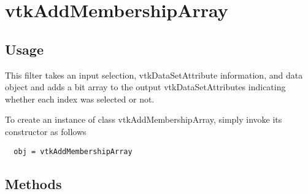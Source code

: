 \section{vtkAddMembershipArray}

\subsection{Usage}

 This filter takes an input selection, vtkDataSetAttribute
 information, and data object and adds a bit array to the output 
 vtkDataSetAttributes indicating whether each index was selected or not.

To create an instance of class vtkAddMembershipArray, simply
invoke its constructor as follows
\begin{verbatim}
  obj = vtkAddMembershipArray
\end{verbatim}
\subsection{Methods}

